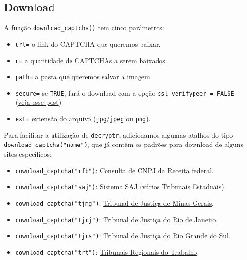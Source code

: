 \documentclass[12pt,]{report}
\providecommand{\tightlist}{%
  \setlength{\itemsep}{0pt}\setlength{\parskip}{0pt}}
\begin{document}
\hypertarget{download}{%
\subsection{Download}\label{download}}

A função \texttt{download\_captcha()} tem cinco parâmetros:

\begin{itemize}
\tightlist
\item
  \texttt{url=} o link do CAPTCHA que queremos baixar.
\item
  \texttt{n=} a quantidade de CAPTCHAs a serem baixados.
\item
  \texttt{path=} a pasta que queremos salvar a imagem.
\item
  \texttt{secure=} se \texttt{TRUE}, fará o download com a opção \texttt{ssl\_verifypeer\ =\ FALSE} (\href{http://curso-r.com/blog/2017/03/31/2017-03-31-ssl/}{veja esse post})
\item
  \texttt{ext=} extensão do arquivo (\texttt{jpg}/\texttt{jpeg} ou \texttt{png}).
\end{itemize}

Para facilitar a utilização do \texttt{decryptr}, adicionamos algumas atalhos do tipo \texttt{download\_captcha("nome")}, que já contêm os padrões para download de alguns sites específicos:

\begin{itemize}
\tightlist
\item
  \texttt{download\_captcha("rfb")}: \href{http://www.receita.fazenda.gov.br/pessoajuridica/cnpj/cnpjreva/cnpjreva_solicitacao2.asp}{Consulta de CNPJ da Receita federal}.
\item
  \texttt{download\_captcha("saj")}: \href{https://esaj.tjsp.jus.br/cjsg/imagemCaptcha.do}{Sistema SAJ (vários Tribunais Estaduais)}.
\item
  \texttt{download\_captcha("tjmg")}: \href{http://www4.tjmg.jus.br/juridico/sf/captcha.svl}{Tribunal de Justiça de Minas Gerais}.
\item
  \texttt{download\_captcha("tjrj")}: \href{http://www4.tjrj.jus.br/consultaProcessoWebV2/captcha}{Tribunal de Justiça do Rio de Janeiro}.
\item
  \texttt{download\_captcha("tjrs")}: \href{http://www.tjrs.jus.br/site_php/consulta/human_check/humancheck_showcode.php}{Tribunal de Justiça do Rio Grande do Sul}.
\item
  \texttt{download\_captcha("trt")}: \href{https://pje.trt3.jus.br/consultaprocessual/seam/resource/captcha}{Tribunais Regionais do Trabalho}.
\end{itemize}
\end{document}
